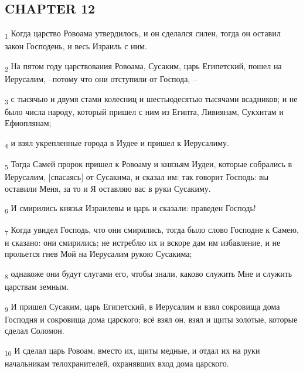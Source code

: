 \subsection{CHAPTER 12}
\begin{tcolorbox}
\textsubscript{1} Когда царство Ровоама утвердилось, и он сделался силен, тогда он оставил закон Господень, и весь Израиль с ним.
\end{tcolorbox}
\begin{tcolorbox}
\textsubscript{2} На пятом году царствования Ровоама, Сусаким, царь Египетский, пошел на Иерусалим, --потому что они отступили от Господа, --
\end{tcolorbox}
\begin{tcolorbox}
\textsubscript{3} с тысячью и двумя стами колесниц и шестьюдесятью тысячами всадников; и не было числа народу, который пришел с ним из Египта, Ливиянам, Сукхитам и Ефиоплянам;
\end{tcolorbox}
\begin{tcolorbox}
\textsubscript{4} и взял укрепленные города в Иудее и пришел к Иерусалиму.
\end{tcolorbox}
\begin{tcolorbox}
\textsubscript{5} Тогда Самей пророк пришел к Ровоаму и князьям Иудеи, которые собрались в Иерусалим, [спасаясь] от Сусакима, и сказал им: так говорит Господь: вы оставили Меня, за то и Я оставляю вас в руки Сусакиму.
\end{tcolorbox}
\begin{tcolorbox}
\textsubscript{6} И смирились князья Израилевы и царь и сказали: праведен Господь!
\end{tcolorbox}
\begin{tcolorbox}
\textsubscript{7} Когда увидел Господь, что они смирились, тогда было слово Господне к Самею, и сказано: они смирились; не истреблю их и вскоре дам им избавление, и не прольется гнев Мой на Иерусалим рукою Сусакима;
\end{tcolorbox}
\begin{tcolorbox}
\textsubscript{8} однакоже они будут слугами его, чтобы знали, каково служить Мне и служить царствам земным.
\end{tcolorbox}
\begin{tcolorbox}
\textsubscript{9} И пришел Сусаким, царь Египетский, в Иерусалим и взял сокровища дома Господня и сокровища дома царского; всё взял он, взял и щиты золотые, которые сделал Соломон.
\end{tcolorbox}
\begin{tcolorbox}
\textsubscript{10} И сделал царь Ровоам, вместо их, щиты медные, и отдал их на руки начальникам телохранителей, охранявших вход дома царского.
\end{tcolorbox}
